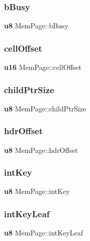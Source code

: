 \mbox{\label{struct_mem_page_a0b7935a6fdec1d6d31c4b3952b0461ea}} 
\subsubsection{bBusy}
{\footnotesize\ttfamily \textbf{ u8} Mem\+Page\+::b\+Busy}

\mbox{\label{struct_mem_page_a324ed834d93c3ae72994fb5730940521}} 
\subsubsection{cellOffset}
{\footnotesize\ttfamily \textbf{ u16} Mem\+Page\+::cell\+Offset}

\mbox{\label{struct_mem_page_aeba10281fc255d9bbc0e31486f8fbd48}} 
\subsubsection{childPtrSize}
{\footnotesize\ttfamily \textbf{ u8} Mem\+Page\+::child\+Ptr\+Size}

\mbox{\label{struct_mem_page_a01967a1a593980fb71c8ccf3393ae156}} 
\subsubsection{hdrOffset}
{\footnotesize\ttfamily \textbf{ u8} Mem\+Page\+::hdr\+Offset}

\mbox{\label{struct_mem_page_a46784c3c4708c7a582cff81a29c55323}} 
\subsubsection{intKey}
{\footnotesize\ttfamily \textbf{ u8} Mem\+Page\+::int\+Key}

\mbox{\label{struct_mem_page_a7c30c56237c38e0b81842ae2a6bae9d7}} 
\subsubsection{intKeyLeaf}
{\footnotesize\ttfamily \textbf{ u8} Mem\+Page\+::int\+Key\+Leaf}

